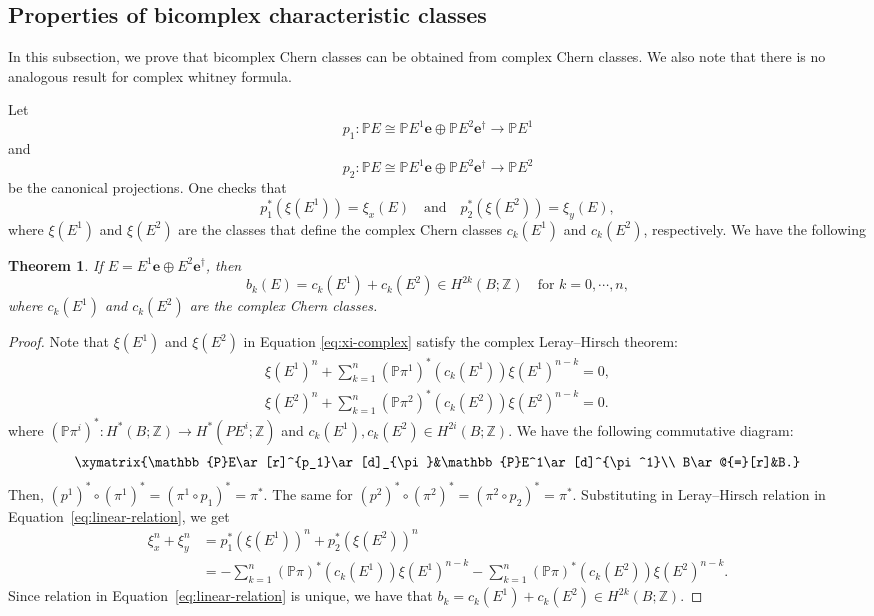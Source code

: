 \documentclass[11pt]{amsart}
\newcommand{\Z}{\mathbb{Z}}
\renewcommand{\P}{\mathbb{P}}
\newcommand{\e}{\mathbf{e}}          %
\newcommand{\ed}{\mathbf{e}^\dagger} %
\newcommand{\wb}{b}
\newtheorem{thm}[prop]{Theorem}
\theoremstyle{definition}
\begin{document}
\subsection{Properties of bicomplex characteristic classes}
In this subsection, we prove that bicomplex Chern classes can be obtained from complex Chern classes.  We also note that there is no analogous result for complex whitney formula.

Let 
\begin{equation*}
p_1: \mathbb{P}E \cong \P E^1\e \oplus \P E^2 \ed\to \mathbb{P}E^1
\end{equation*}
and 
\begin{equation*}
p_2: \P E \cong \P E^1\e \oplus \P E^2\ed \to \mathbb{P}E^2
\end{equation*}
be the canonical projections. One checks that
\begin{equation*}\label{eq:xi-complex}
p_1^*(\xi(E^1)) = \xi_x(E) \quad \text{and}\quad p_2^*(\xi(E^2)) = \xi_y(E),
\end{equation*}
where $\xi(E^1)$ and $\xi(E^2)$ are the classes that define the complex Chern classes $c_k(E^1)$ and $c_k(E^2)$, respectively. We have the following 
\begin{thm}\label{prop:bicomplex-class-descomposotion}
    If $E=E^1\e\oplus E^2\ed$, then 
    \begin{equation*}
        \wb_k(E)=c_k(E^1)+c_k(E^2) \in H^{2k}(B;\Z)\quad \text{for $k=0,\cdots,n$},
    \end{equation*}
    where $c_k(E^1)$ and $c_k(E^2)$ are the complex Chern classes.
\end{thm}

\begin{proof}
Note that $\xi(E^1)$ and $\xi(E^2)$ in Equation \eqref{eq:xi-complex} satisfy the complex Leray--Hirsch theorem:
\begin{gather*}
    \xi(E^1)^n+\sum_{k=1}^n (\P\pi^1)^*(c_k(E^1))\xi(E^1)^{n-k}=0,\\
    \xi(E^2)^n+\sum_{k=1}^n (\P\pi^2)^*(c_k(E^2))\xi(E^2)^{n-k}=0.
\end{gather*}
where $(\P\pi^i)^*:H^*(B;\Z)\to H^*(PE^i;\Z)$ and $c_k(E^1),c_k(E^2)\in H^{2i}(B;\Z)$. We have the following commutative diagram:
\begin{equation*}
    \xymatrix{\P E\ar[r]^{p_1}\ar[d]_{\pi}&\P E^1\ar[d]^{\pi^1}\\ B\ar@{=}[r]&B.}
\end{equation*}
Then, $(p^1)^*\circ(\pi^1)^*=(\pi^1\circ p_1)^*=\pi^*$. The same for $(p^2)^*\circ(\pi^2)^*=(\pi^2\circ p_2)^*=\pi^*$. Substituting in Leray--Hirsch relation in Equation~\eqref{eq:linear-relation}, we get
\begin{align*}
    \xi_x^n + \xi_y^n &=p^*_1(\xi(E^1))^n+p^*_2(\xi(E^2))^n\\
    &=-\sum_{k=1}^n (\P\pi)^*(c_k(E^1))\xi(E^1)^{n-k}-\sum_{k=1}^n (\P\pi)^*(c_k(E^2))\xi(E^2)^{n-k}.
\end{align*}
Since relation in Equation~\eqref{eq:linear-relation} is unique, we have that $\wb_k=c_k(E^1)+c_k(E^2)\in H^{2k}(B;\Z)$.
\end{proof}
\end{document}
